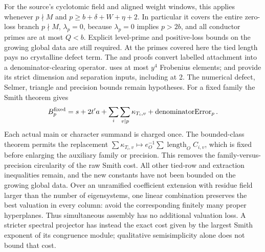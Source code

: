 For the source's cyclotomic field and aligned weight windows, this
applies whenever \(p\nmid M\) and
\(p\ge b+\delta+W+\eta+2\). In particular it covers the entire
zero-loss branch \(p\nmid M\), \(\lambda_p=0\), because
\(\lambda_p=0\) implies \(p>2b\), and all conductor primes are
at most \(Q<b\). Explicit level-prime and positive-loss bounds on
the growing global data are still required. At the primes covered here the tied length pays
no crystalline defect term.
The 
and 
proofs convert labelled attachment into a denominator-clearing operator.
uses at most \(y^4\) Frobenius elements;
 and
provide its strict dimension and separation inputs, including at 2.
The numerical defect, Selmer, triangle and precision bounds remain
hypotheses. For a fixed family the Smith theorem gives
\[
 B_p^{\rm fixed}=s+2t'a+\sum_i\sum_{v\mid p}\kappa_{T_i,v}
                     +\operatorname{denominatorError}_p.
\]
Each actual main or character summand is charged once. The bounded-class
theorem permits the replacement
\(\sum\kappa_{T_i,v}\mapsto e_O^{-1}\sum\operatorname{length}_O C_{i,v}\),
which is fixed before enlarging the auxiliary family or precision.
This removes the family-versus-precision circularity of the raw Smith
cost. All other tied-row and extraction inequalities remain, and the
new constants have not been bounded on the growing global data.
Over an
unramified coefficient extension with residue field larger than the
number of eigensystems, one linear combination preserves the best
valuation in every column: avoid the corresponding finitely many
proper hyperplanes. Thus simultaneous assembly has no additional
valuation loss. A stricter spectral projector has instead the exact
cost given by the largest Smith exponent of its congruence module;
qualitative semisimplicity alone does not bound that cost.

